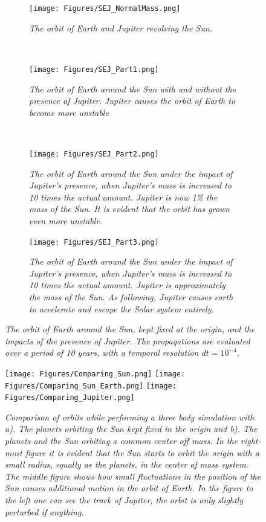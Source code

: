 \documentclass[%
reprint,nofootinbib,
amsmath,amssymb,
aps,
]{revtex4-1}
\begin{document}
\begin{figure}[t!]
	\centering
	\begin{subfigure}{0.45\textwidth}
		\centering
		\texttt{[image: Figures/SEJ\_NormalMass.png]}
		\caption{\textit{The orbit of Earth and Jupiter revolving the Sun. }}
	\end{subfigure}%
	~ 
	\begin{subfigure}{0.45\textwidth}
		\centering
		\texttt{[image: Figures/SEJ\_Part1.png]}
		\caption{\textit{The orbit of Earth around the Sun with and without the presence of Jupiter. Jupiter causes the orbit of Earth to become more unstable}}
	\end{subfigure}\\ 
	\begin{subfigure}{0.45\textwidth}
		\centering
		\texttt{[image: Figures/SEJ\_Part2.png]}
		\caption{\textit{The orbit of Earth around the Sun under the impact of Jupiter's presence, when Jupiter's mass is increased to 10 times the actual amount. Jupiter is now 1\% the mass of the Sun. It is evident that the orbit has grown even more unstable.}}
	\end{subfigure}
	\begin{subfigure}{0.45\textwidth}
		\centering
		\texttt{[image: Figures/SEJ\_Part3.png]}
		\caption{\textit{The orbit of Earth around the Sun under the impact of Jupiter's presence, when Jupiter's mass is increased to 10 times the actual amount. Jupiter is approximately the mass of the Sun. As following, Jupiter causes earth to accelerate and escape the Solar system entirely.}}
	\end{subfigure} \vspace{1mm}
	\caption{\textit{The orbit of Earth around the Sun, kept fixed at the origin, and the impacts of the presence of Jupiter. The propagations are evaluated over a period of 10 years, with a temporal resolution $dt = 10^{-4}$.} \label{threebody}}
\end{figure}

\begin{figure}[H]
	\texttt{[image: Figures/Comparing\_Sun.png]} \hspace{2mm}
	\texttt{[image: Figures/Comparing\_Sun\_Earth.png]} \hspace{2mm}
	\texttt{[image: Figures/Comparing\_Jupiter.png]}
	\caption{\label{ThreeBody} \textit{Comparison of orbits while performing a three body simulation with a). The planets orbiting the Sun kept fixed in the origin and b). The planets and the Sun orbiting a common center off mass. In the right-most figure it is evident that the Sun starts to orbit the origin with a small radius, equally as the planets, in the center of mass system. The middle figure shows how small fluctuations in the position of the Sun causes additional motion in the orbit of Earth. In the figure to the left one can see the track of Jupiter, the orbit is only slightly perturbed if anything.}}
\end{figure}
\end{document}
